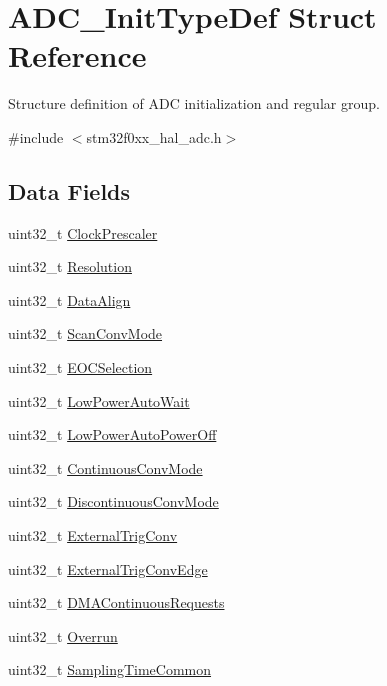 \hypertarget{struct_a_d_c___init_type_def}{}\section{A\+D\+C\+\_\+\+Init\+Type\+Def Struct Reference}
\label{struct_a_d_c___init_type_def}


Structure definition of A\+DC initialization and regular group.  




{\ttfamily \#include $<$stm32f0xx\+\_\+hal\+\_\+adc.\+h$>$}

\subsection*{Data Fields}
\begin{DoxyCompactItemize}
\item 
uint32\+\_\+t \hyperlink{struct_a_d_c___init_type_def_ab791f8fac403d508e1c53b6f27cf1f24}{Clock\+Prescaler}
\item 
uint32\+\_\+t \hyperlink{struct_a_d_c___init_type_def_a6613985e603e784c30fb3689f2c6fa5f}{Resolution}
\item 
uint32\+\_\+t \hyperlink{struct_a_d_c___init_type_def_afe646b2571044212378bf5f722544359}{Data\+Align}
\item 
uint32\+\_\+t \hyperlink{struct_a_d_c___init_type_def_a67902b5cdd3d1aa4af49654409412a08}{Scan\+Conv\+Mode}
\item 
uint32\+\_\+t \hyperlink{struct_a_d_c___init_type_def_a92de48abe9cbd958145ce5bc090ea383}{E\+O\+C\+Selection}
\item 
uint32\+\_\+t \hyperlink{struct_a_d_c___init_type_def_a434598c5a9cc1d6e95df613945d5027c}{Low\+Power\+Auto\+Wait}
\item 
uint32\+\_\+t \hyperlink{struct_a_d_c___init_type_def_aec71cb32439e31735b089f2736344293}{Low\+Power\+Auto\+Power\+Off}
\item 
uint32\+\_\+t \hyperlink{struct_a_d_c___init_type_def_a768ec42e36553ad0acb7ad029462a59d}{Continuous\+Conv\+Mode}
\item 
uint32\+\_\+t \hyperlink{struct_a_d_c___init_type_def_a9029916649c9ed5db0a3d86c7a0841bb}{Discontinuous\+Conv\+Mode}
\item 
uint32\+\_\+t \hyperlink{struct_a_d_c___init_type_def_a3f4a71424165638d6621d75a351cb5e0}{External\+Trig\+Conv}
\item 
uint32\+\_\+t \hyperlink{struct_a_d_c___init_type_def_ace2c616b80bb7f1982e8a52131a2732c}{External\+Trig\+Conv\+Edge}
\item 
uint32\+\_\+t \hyperlink{struct_a_d_c___init_type_def_a304c6a7957f73ed08df4f8a5d467958f}{D\+M\+A\+Continuous\+Requests}
\item 
uint32\+\_\+t \hyperlink{struct_a_d_c___init_type_def_ac20c5da6d0ffd3de9c705eff0f5a13bc}{Overrun}
\item 
uint32\+\_\+t \hyperlink{struct_a_d_c___init_type_def_a66567dbf0cd76f9d381c9f1d5994c7ed}{Sampling\+Time\+Common}
\end{DoxyCompactItemize}


